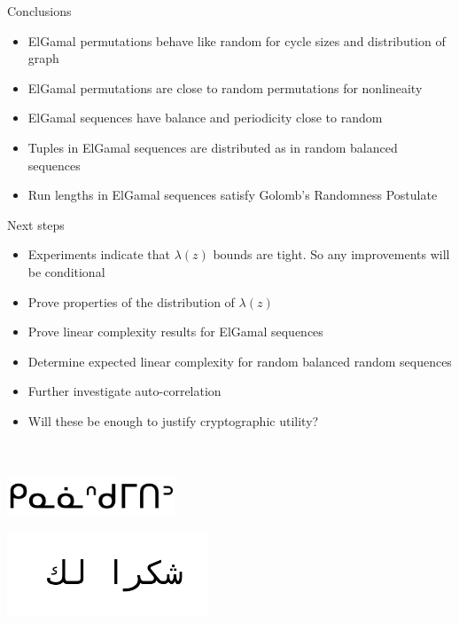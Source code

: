\begin{frame}{Conclusions}

  \begin{itemize}
    \item ElGamal permutations behave like random for cycle sizes and distribution of graph
    \item ElGamal permutations are close to random permutations for nonlineaity
    \item ElGamal sequences have balance and periodicity close to random
    \item Tuples in ElGamal sequences are distributed as in random balanced sequences
    \item Run lengths in ElGamal sequences satisfy Golomb's Randomness Postulate
    \end{itemize}
  
\end{frame}

\begin{frame}{Next steps}

  \begin{itemize}
  \item Experiments indicate that $\lambda(z)$ bounds are tight.  So any improvements will be conditional
  \item Prove properties of the distribution of $\lambda(z)$
  \item Prove linear complexity results for ElGamal sequences
  \item Determine expected linear complexity for random balanced random sequences
  \item Further investigate auto-correlation
    \item Will these be enough to justify cryptographic utility? 
    \end{itemize}
  
\end{frame}


\begin{frame}{}

  \begin{center}
   \\

   \\

  
  \includegraphics[width=5cm]{kinanaskomitin.png}

  
  
  \includegraphics[width=6cm]{shukran_lak.png}
\end{center}
  
  
\end{frame}




